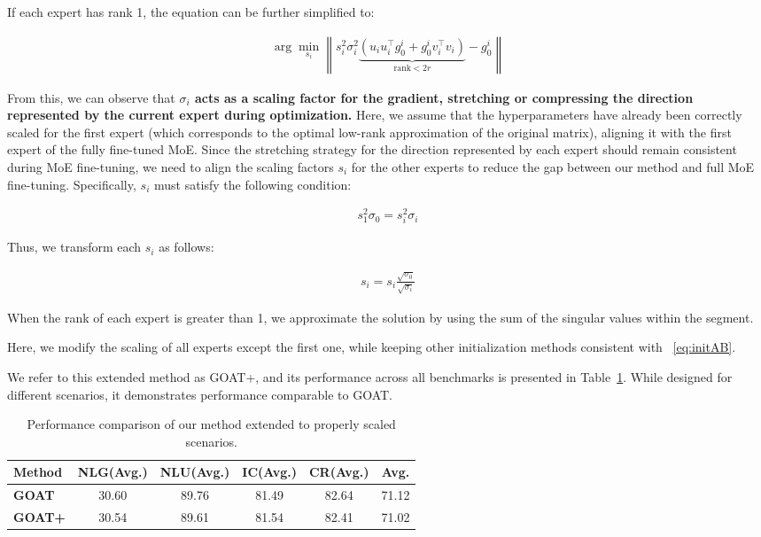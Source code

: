 If each expert has rank 1, the equation can be further simplified to:

\begin{align}
\arg\min_{s_i} \left\| s_i^2 \sigma_i^2 \underbrace{\left( u_i u_i^\top g^i_0 + g^i_0 v_i^\top v_i \right)}_{\text{rank} < 2r} - g^i_0 \right\|
\end{align}

From this, we can observe that \textbf{\(\sigma_i\) acts as a scaling factor for the gradient, stretching or compressing the direction represented by the current expert during optimization.} Here, we assume that the hyperparameters have already been correctly scaled for the first expert (which corresponds to the optimal low-rank approximation of the original matrix), aligning it with the first expert of the fully fine-tuned MoE. Since the stretching strategy for the direction represented by each expert should remain consistent during MoE fine-tuning, we need to align the scaling factors \(s_i\) for the other experts to reduce the gap between our method and full MoE fine-tuning. Specifically, \(s_i\) must satisfy the following condition:

\begin{align}
s_1^2 \sigma_0 = s_i^2 \sigma_i
\end{align}

Thus, we transform each \(s_i\) as follows:

\begin{align}
s_i = s_i \frac{\sqrt{\sigma_0}}{\sqrt{\sigma_i}}
\end{align}

When the rank of each expert is greater than 1, we approximate the solution by using the sum of the singular values within the segment.

Here, we modify the scaling of all experts except the first one, while keeping other initialization methods consistent with ~\ref{eq:initAB}.

We refer to this extended method as GOAT+, and its performance across all benchmarks is presented in Table~\ref{tab:goat_pro}. While designed for different scenarios, it demonstrates performance comparable to GOAT.
\begin{table}[ht]
\centering
\begin{tabular}{l*{5}{c}} \toprule
\textbf{Method} & \textbf{NLG(Avg.)} & \textbf{NLU(Avg.)} & \textbf{IC(Avg.)} & \textbf{CR(Avg.)} & \textbf{Avg.} \\ \midrule
\textbf{GOAT}   & 30.60      & 89.76     & 81.49    & 82.64    & 71.12 \\
\textbf{GOAT+}  & 30.54      & 89.61     & 81.54    & 82.41    & 71.02 \\ \bottomrule
\end{tabular}
\caption{Performance comparison of our method extended to properly scaled scenarios.}
\label{tab:goat_pro}
\end{table}


